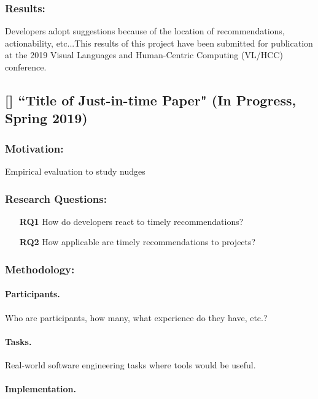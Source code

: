 \subsubsection{Results:} Developers adopt suggestions because of the location of recommendations, actionability, etc...This results of this project have been submitted for publication at the 2019 Visual Languages and Human-Centric Computing (VL/HCC) conference.

\subsection{[\jit] ``Title of Just-in-time Paper" (In Progress, Spring 2019)}

\subsubsection{Motivation:} Empirical evaluation to study \timing nudges

\subsubsection{Research Questions:}

\begin{itemize}
    \item[\textbf{RQ1}] How do developers react to timely recommendations?
    \item[\textbf{RQ2}] How applicable are timely recommendations to projects?
\end{itemize}

\subsubsection{Methodology:}

\paragraph{Participants.}

Who are participants, how many, what experience do they have, etc.?

\paragraph{Tasks.}

Real-world software engineering tasks where tools would be useful.

\paragraph{Implementation.}

